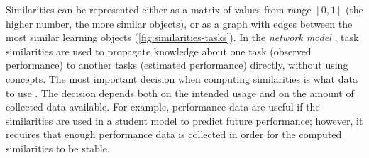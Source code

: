 Similarities can be represented either as a matrix of values from range $[0, 1]$
(the higher number, the more similar objects),
or as a graph with edges between the most similar learning objects
(\cref{fig:similarities-tasks}).
In the \emph{network model} \cite{rihak-phd}, task similarities are used to propagate
knowledge about one task (observed performance) to another tasks (estimated performance)
directly, without using concepts.
The most important decision when computing similarities is what data to use
\cite{alg.similarity}.
The decision depends both on the intended usage and on the amount of collected data
available. For example, performance data are useful if the similarities are used in a
student model to predict future performance; however, it requires that enough
performance data is collected in order for the computed similarities to be stable.

